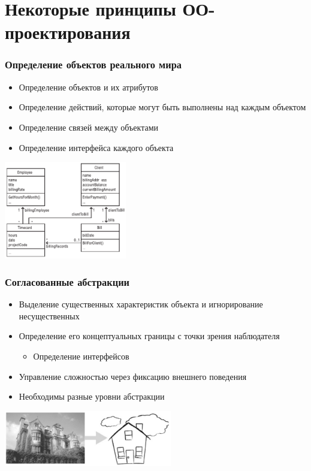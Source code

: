 \documentclass[xetex,mathserif,serif]{beamer}
\begin{document}
	\section{Некоторые принципы ОО-проектирования}

	\begin{frame}
		\frametitle{Определение объектов реального мира}
		\begin{itemize}
			\item Определение объектов и их атрибутов
			\item Определение действий, которые могут быть выполнены над каждым объектом
			\item Определение связей между объектами
			\item Определение интерфейса каждого объекта
		\end{itemize}
		\begin{center}
			\includegraphics[width=0.4\textwidth]{billDomainModel.png}
		\end{center}
	\end{frame}

	\begin{frame}
		\frametitle{Согласованные абстракции}
		\begin{itemize}
			\item Выделение существенных характеристик объекта и игнорирование несущественных
			\item Определение его концептуальных границы с точки зрения наблюдателя
			\begin{itemize}
				\item Определение интерфейсов
			\end{itemize}
			\item Управление сложностью через фиксацию внешнего поведения
			\item Необходимы разные уровни абстракции
		\end{itemize}
		\begin{center}
			\includegraphics[width=0.55\textwidth]{abstraction.png}
		\end{center}
	\end{frame}
\end{document}
